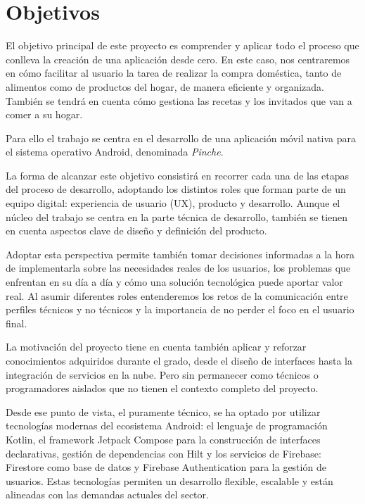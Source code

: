 \cleardoublepage %
\chapter{Objetivos} %
\label{chap:objetivos} %

El objetivo principal de este proyecto es comprender y aplicar todo el proceso que conlleva la creación de una aplicación desde cero. En este caso, nos centraremos en cómo facilitar al usuario la tarea de realizar la compra doméstica, tanto de alimentos como de productos del hogar, de manera eficiente y organizada. También se tendrá en cuenta cómo gestiona las recetas y los invitados que van a comer a su hogar.

Para ello el trabajo se centra en el desarrollo de una aplicación móvil nativa para el sistema operativo Android, denominada \textit{Pinche}.

La forma de alcanzar este objetivo consistirá en recorrer cada una de las etapas del proceso de desarrollo, adoptando los distintos roles que forman parte de un equipo digital: experiencia de usuario (UX), producto y desarrollo. Aunque el núcleo del trabajo se centra en la parte técnica de desarrollo, también se tienen en cuenta aspectos clave de diseño y definición del producto.

Adoptar esta perspectiva permite también tomar decisiones informadas a la hora de implementarla sobre las necesidades reales de los usuarios, los problemas que enfrentan en su día a día y cómo una solución tecnológica puede aportar valor real. Al asumir diferentes roles entenderemos los retos de la comunicación entre perfiles técnicos y no técnicos y la importancia de no perder el foco en el usuario final.

La motivación del proyecto tiene en cuenta también aplicar y reforzar conocimientos adquiridos durante el grado, desde el diseño de interfaces hasta la integración de servicios en la nube. Pero sin permanecer como técnicos o programadores aislados que no tienen el contexto completo del proyecto.

Desde ese punto de vista, el puramente técnico, se ha optado por utilizar tecnologías modernas del ecosistema Android: el lenguaje de programación Kotlin, el framework Jetpack Compose para la construcción de interfaces declarativas, gestión de dependencias con Hilt y los servicios de Firebase: Firestore como base de datos y Firebase Authentication para la gestión de usuarios. Estas tecnologías permiten un desarrollo flexible, escalable y están alineadas con las demandas actuales del sector.


